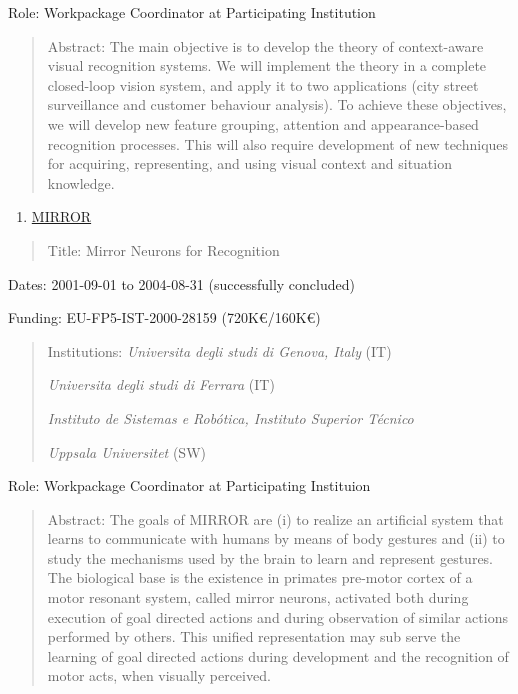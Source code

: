 Role: Workpackage Coordinator at Participating Institution

\begin{quote}
Abstract: The main objective is to develop the theory of context-aware
visual recognition systems. We will implement the theory in a complete
closed-loop vision system, and apply it to two applications (city street
surveillance and customer behaviour analysis). To achieve these
objectives, we will develop new feature grouping, attention and
appearance-based recognition processes. This will also require
development of new techniques for acquiring, representing, and using
visual context and situation knowledge.
\end{quote}

\begin{enumerate}
\def\labelenumi{\arabic{enumi}.}
\setcounter{enumi}{17}
\item
  \ul{MIRROR}
\end{enumerate}

\begin{quote}
Title: Mirror Neurons for Recognition
\end{quote}

Dates: 2001-09-01 to 2004-08-31 (successfully concluded)

Funding: EU-FP5-IST-2000-28159 (720K€/160K€)

\begin{quote}
Institutions: \emph{Universita degli studi di Genova, Italy} (IT)

\emph{Universita degli studi di Ferrara} (IT)

\emph{Instituto de Sistemas e Robótica, Instituto Superior Técnico}

\emph{Uppsala Universitet} (SW)
\end{quote}

Role: Workpackage Coordinator at Participating Instituion

\begin{quote}
Abstract: The goals of MIRROR are (i) to realize an artificial system
that learns to communicate with humans by means of body gestures and
(ii) to study the mechanisms used by the brain to learn and represent
gestures. The biological base is the existence in primates pre-motor
cortex of a motor resonant system, called mirror neurons, activated both
during execution of goal directed actions and during observation of
similar actions performed by others. This unified representation may sub
serve the learning of goal directed actions during development and the
recognition of motor acts, when visually perceived.
\end{quote}

